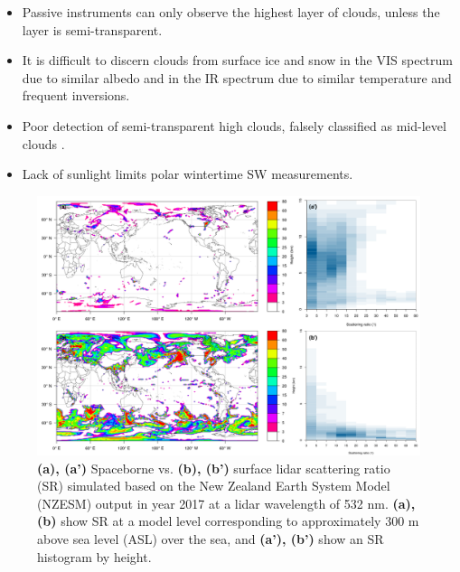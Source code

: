 \begin{itemize}
\item Passive instruments can only observe the highest layer of clouds, unless
the layer is semi-transparent.
\item It is difficult to discern clouds from surface ice and snow
in the VIS spectrum due to similar albedo and in the IR
spectrum due to similar
temperature and frequent inversions.
\item Poor detection of semi-transparent high clouds, falsely classified as
mid-level clouds \citep{haynes2011}.
\item Lack of sunlight limits polar wintertime SW measurements.
\end{itemize}

\begin{figure}[t]
\centering
\includegraphics[width=\textwidth]{fig/space_vs_surface_lidar.png}
\caption{
\textbf{(a), (a')} Spaceborne vs. \textbf{(b), (b')} surface lidar scattering ratio
(SR) simulated based on the New Zealand Earth System Model (NZESM) output in
year 2017 at a lidar wavelength of 532 nm.
\textbf{(a), (b)} show SR at a model level corresponding to approximately 300 m
above sea level (ASL) over the sea, and \textbf{(a'), (b')} show an SR histogram by height.
}
\label{fig:surface-vs-spaceborne-lidar}
\end{figure}

